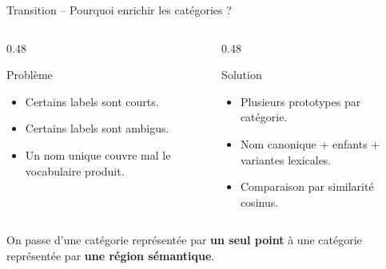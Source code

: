\documentclass[11pt,aspectratio=169]{beamer}
\begin{document}
\begin{frame}{Transition -- Pourquoi enrichir les catégories ?}
\small
\begin{columns}
\begin{column}{0.48\textwidth}
\begin{block}{Problème}
\begin{itemize}
    \item Certains labels sont courts.
    \item Certains labels sont ambigus.
    \item Un nom unique couvre mal le vocabulaire produit.
\end{itemize}
\end{block}
\end{column}

\begin{column}{0.48\textwidth}
\begin{block}{Solution}
\begin{itemize}
    \item Plusieurs prototypes par catégorie.
    \item Nom canonique + enfants + variantes lexicales.
    \item Comparaison par similarité cosinus.
\end{itemize}
\end{block}
\end{column}
\end{columns}

\vspace{0.35cm}

\begin{takeawaybox}
\centering
On passe d'une catégorie représentée par \textbf{un seul point} à une catégorie représentée par \textbf{une région sémantique}.
\end{takeawaybox}
\end{frame}
\end{document}
